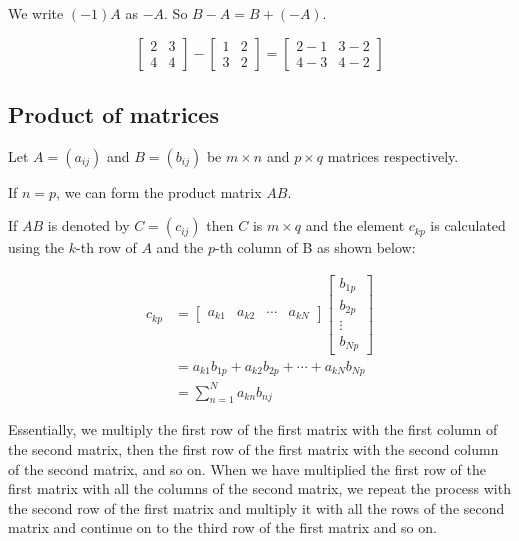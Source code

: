 \documentclass[11pt]{article}
\begin{document}
We write \((-1)A\) as \(-A\). So \(B - A = B + (- A)\).

\begin{displaymath}
\begin{bmatrix}
2 & 3 \\
4 & 4
\end{bmatrix} - \begin{bmatrix}
1 & 2 \\
3 & 2
\end{bmatrix} = \begin{bmatrix}
2 - 1 & 3 - 2 \\
4 - 3 & 4 - 2
\end{bmatrix}
\end{displaymath}

 \newpage
\subsection{Product of matrices}
\label{sec:org4ad6a82}
Let \(A = (a_{ij})\) and \(B = (b_{ij})\) be \(m \times n\) and \(p \times q\) matrices respectively.

If \(n = p\), we can form the product matrix \(AB\).


If \(AB\) is denoted by \(C = (c_{ij})\) then \(C\) is \(m \times q\) and the element \(c_{kp}\) is calculated using the \(k\)-th row of \(A\) and the \(p\)-th column of B as shown below:

\begin{align*}
c_{kp} &= \begin{bmatrix}
a_{k1} & a_{k2} & \cdots & a_{kN}
\end{bmatrix} \begin{bmatrix}
b_{1p} \\
b_{2p} \\
\vdots \\
b_{Np}
\end{bmatrix} \\
&= a_{k1} b_{1p} + a_{k2} b_{2p} + \cdots + a_{kN} b_{Np} \\
&= \sum_{n=1}^{N} a_{kn} b_{nj}
\end{align*}

Essentially, we multiply the first row of the first matrix with the first column of the second matrix, then the first row of the first matrix with the second column of the second matrix, and so on. When we have multiplied the first row of the first matrix with all the columns of the second matrix, we repeat the process with the second row of the first matrix and multiply it with all the rows of the second matrix and continue on to the third row of the first matrix and so on.
\end{document}
